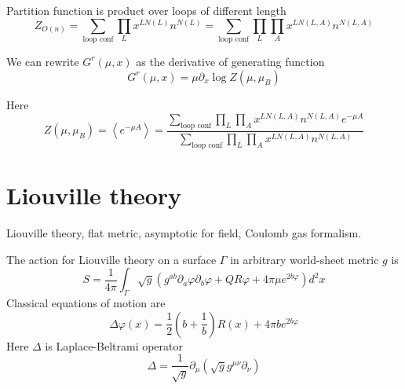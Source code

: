 \documentclass[12pt]{article}
\begin{document}
Partition function is product over loops of different length
\begin{equation}
  \label{eq:10}
  Z_{O(n)} = \sum_{\mbox{loop conf}} \prod_L x^{L N(L)} n^{N(L)} = \sum_{\mbox{loop conf}} \prod_L\prod_A x^{L N(L,A)} n^{N(L,A)}
\end{equation}


We can rewrite $G^r(\mu,x)$ as the derivative of generating function
\begin{equation}
  \label{eq:7}
  G^r(\mu,x)=\mu\partial_x \log Z(\mu,\mu_B)
\end{equation}

Here
\begin{equation}
  \label{eq:8}
  Z(\mu,\mu_B) = \left< e^{-\mu A} \right> = \frac{\sum_{\mbox{loop conf}}
  \prod_L\prod_A x^{L N(L,A)} n^{N(L,A)} e^{-\mu A}}{\sum_{\mbox{loop conf}} \prod_L\prod_A x^{L N(L,A)} n^{N(L,A)}}
\end{equation}


\section{Liouville theory}
\label{sec:liouville-theory}

Liouville theory, flat metric, asymptotic for field, Coulomb gas formalism. \cite{nakayama2004liouville,ponsot2002boundary,teschner2001liouville,fateev2000boundary,teschner2000remarks,zamolodchikov1996conformal}

The action for Liouville theory on a surface $\Gamma$ in arbitrary world-sheet metric $g$ is
\begin{equation}
  \label{eq:13}
  S=\frac{1}{4\pi} \int_{\Gamma} \sqrt{g} \left( g^{ab} \partial_{a}\varphi \partial_{b}\varphi + Q R \varphi +4\pi \mu e^{2b\varphi}\right) d^{2}x
\end{equation}
Classical equations of motion are
\begin{equation}
  \label{eq:16}
  \Delta \varphi(x) = \frac{1}{2} \left(b+\frac{1}{b}\right) R (x) + 4\pi b e^{2 b \varphi}
\end{equation}
Here $\Delta$ is Laplace-Beltrami operator
\begin{equation}
  \label{eq:17}
  \Delta=\frac{1}{\sqrt{g}}\partial_{\mu} \left(\sqrt{g} g^{\mu\nu} \partial_{\nu}\right)
\end{equation}
\end{document}
